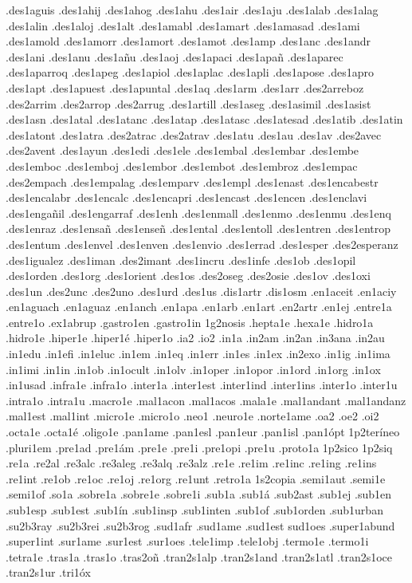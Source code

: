 {.des1aguis
.des1ahij
.des1ahog
.des1ahu
.des1air
.des1aju
.des1alab
.des1alag
.des1alin
.des1aloj
.des1alt
.des1amabl
.des1amart
.des1amasad
.des1ami
.des1amold
.des1amorr
.des1amort
.des1amot
.des1amp
.des1anc
.des1andr
.des1ani
.des1anu
.des1a^^f1u
.des1aoj
.des1apaci
.des1apa^^f1
.des1aparec
.des1aparroq
.des1apeg
.des1apiol
.des1aplac
.des1apli
.des1apose
.des1apro
.des1apt
.des1apuest
.des1apuntal
.des1aq
.des1arm
.des1arr
.des2arreboz
.des2arrim
.des2arrop
.des2arrug
.des1artill
.des1aseg
.des1asimil
.des1asist
.des1asn
.des1atal
.des1atanc
.des1atap
.des1atasc
.des1atesad
.des1atib
.des1atin
.des1atont
.des1atra
.des2atrac
.des2atrav
.des1atu
.des1au
.des1av
.des2avec
.des2avent
.des1ayun
.des1edi
.des1ele
.des1embal
.des1embar
.des1embe
.des1emboc
.des1emboj
.des1embor
.des1embot
.des1embroz
.des1empac
.des2empach
.des1empalag
.des1emparv
.des1empl
.des1enast
.des1encabestr
.des1encalabr
.des1encalc
.des1encapri
.des1encast
.des1encen
.des1enclavi
.des1enga^^f1il
.des1engarraf
.des1enh
.des1enmall
.des1enmo
.des1enmu
.des1enq
.des1enraz
.des1ensa^^f1
.des1ense^^f1
.des1ental
.des1entoll
.des1entren
.des1entrop
.des1entum
.des1envel
.des1enven
.des1envio
.des1errad
.des1esper
.des2esperanz
.des1igualez
.des1iman
.des2imant
.des1incru
.des1infe
.des1ob
.des1opil
.des1orden
.des1org
.des1orient
.des1os
.des2oseg
.des2osie
.des1ov
.des1oxi
.des1un
.des2unc
.des2uno
.des1urd
.des1us
.dis1artr
.dis1osm
.en1aceit
.en1aciy
.en1aguach
.en1aguaz
.en1anch
.en1apa
.en1arb
.en1art
.en2artr
.en1ej
.entre1a
.entre1o
.ex1abrup
.gastro1en
.gastro1in
1g2nosis
.hepta1e
.hexa1e
.hidro1a
.hidro1e
.hiper1e
.hiper1^^e9
.hiper1o
.ia2
.io2
.in1a
.in2am
.in2an
.in3ana
.in2au
.in1edu
.in1efi
.in1eluc
.in1em
.in1eq
.in1err
.in1es
.in1ex
.in2exo
.in1ig
.in1ima
.in1imi
.in1in
.in1ob
.in1ocult
.in1olv
.in1oper
.in1opor
.in1ord
.in1org
.in1ox
.in1usad
.infra1e
.infra1o
.inter1a
.inter1est
.inter1ind
.inter1ins
.inter1o
.inter1u
.intra1o
.intra1u
.macro1e
.mal1acon
.mal1acos
.mala1e
.mal1andant
.mal1andanz
.mal1est
.mal1int
.micro1e
.micro1o
.neo1
.neuro1e
.norte1ame
.oa2
.oe2
.oi2
.octa1e
.octa1^^e9
.oligo1e
.pan1ame
.pan1esl
.pan1eur
.pan1isl
.pan1^^f3pt
1p2ter^^edneo
.pluri1em
.pre1ad
.pre1^^e1m
.pre1e
.pre1i
.pre1opi
.pre1u
.proto1a
1p2sico
1p2siq
.re1a
.re2al
.re3alc
.re3aleg
.re3alq
.re3alz
.re1e
.re1im
.re1inc
.re1ing
.re1ins
.re1int
.re1ob
.re1oc
.re1oj
.re1org
.re1unt
.retro1a
1s2copia
.semi1aut
.semi1e
.semi1of
.so1a
.sobre1a
.sobre1e
.sobre1i
.sub1a
.sub1^^e1
.sub2ast
.sub1ej
.sub1en
.sub1esp
.sub1est
.sub1^^edn
.sub1insp
.sub1inten
.sub1of
.sub1orden
.sub1urban
.su2b3ray
.su2b3rei
.su2b3rog
.sud1afr
.sud1ame
.sud1est
sud1oes
.super1abund
.super1int
.sur1ame
.sur1est
.sur1oes
.tele1imp
.tele1obj
.termo1e
.termo1i
.tetra1e
.tras1a
.tras1o
.tras2o^^f1
.tran2s1alp
.tran2s1and
.tran2s1atl
.tran2s1oce
.tran2s1ur
.tri1^^f3x
}
